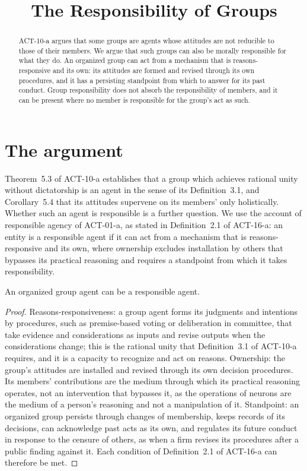 \documentclass{situationist-preprint}
\title{The Responsibility of Groups}
\begin{document}
\maketitle

\begin{abstract}
ACT-10-a argues that some groups are agents whose attitudes are not reducible to those of their members. We argue that such groups can also be morally responsible for what they do. An organized group can act from a mechanism that is reasons-responsive and its own: its attitudes are formed and revised through its own procedures, and it has a persisting standpoint from which to answer for its past conduct. Group responsibility does not absorb the responsibility of members, and it can be present where no member is responsible for the group's act as such.
\end{abstract}

\section{The argument}

Theorem~5.3 of ACT-10-a establishes that a group which achieves rational unity without dictatorship is an agent in the sense of its Definition~3.1, and Corollary~5.4 that its attitudes supervene on its members' only holistically. Whether such an agent is responsible is a further question. We use the account of responsible agency of ACT-01-a, as stated in Definition~2.1 of ACT-16-a: an entity is a responsible agent if it can act from a mechanism that is reasons-responsive and its own, where ownership excludes installation by others that bypasses its practical reasoning and requires a standpoint from which it takes responsibility.

\begin{proposition}\label{p:resp}
An organized group agent can be a responsible agent.
\end{proposition}

\begin{proof}
Reasons-responsiveness: a group agent forms its judgments and intentions by procedures, such as premise-based voting or deliberation in committee, that take evidence and considerations as inputs and revise outputs when the considerations change; this is the rational unity that Definition~3.1 of ACT-10-a requires, and it is a capacity to recognize and act on reasons. Ownership: the group's attitudes are installed and revised through its own decision procedures. Its members' contributions are the medium through which its practical reasoning operates, not an intervention that bypasses it, as the operations of neurons are the medium of a person's reasoning and not a manipulation of it. Standpoint: an organized group persists through changes of membership, keeps records of its decisions, can acknowledge past acts as its own, and regulates its future conduct in response to the censure of others, as when a firm revises its procedures after a public finding against it. Each condition of Definition~2.1 of ACT-16-a can therefore be met.
\end{proof}
\end{document}

